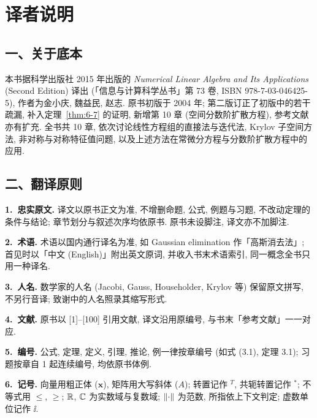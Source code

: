 \cleardoublepage
{}
\chapter*{译者说明}

\section*{一、关于底本}

本书据科学出版社 2015 年出版的 \textit{Numerical Linear Algebra and Its Applications} (Second Edition) 译出 (「信息与计算科学丛书」第 73 卷, ISBN 978-7-03-046425-5), 作者为金小庆, 魏益民, 赵志. 原书初版于 2004 年; 第二版订正了初版中的若干疏漏, 补入定理~\ref{thm:6-7} 的证明, 新增第 10 章 (空间分数阶扩散方程), 参考文献亦有扩充. 全书共 10 章, 依次讨论线性方程组的直接法与迭代法, Krylov 子空间方法, 非对称与对称特征值问题, 以及上述方法在常微分方程与分数阶扩散方程中的应用.

\section*{二、翻译原则}

\noindent\textbf{1.~忠实原文.} 译文以原书正文为准, 不增删命题, 公式, 例题与习题, 不改动定理的条件与结论; 章节划分与叙述次序均依原书. 原书未设脚注, 译文亦不加脚注.

\smallskip
\noindent\textbf{2.~术语.} 术语以国内通行译名为准, 如 Gaussian elimination 作「高斯消去法」; 首见时以「中文 (English)」附出英文原词, 并收入书末术语索引, 同一概念全书只用一种译名.

\smallskip
\noindent\textbf{3.~人名.} 数学家的人名 (Jacobi, Gauss, Householder, Krylov 等) 保留原文拼写, 不另行音译; 致谢中的人名照录其缩写形式.

\smallskip
\noindent\textbf{4.~文献.} 原书以 [1]--[100] 引用文献, 译文沿用原编号, 与书末「参考文献」一一对应.

\smallskip
\noindent\textbf{5.~编号.} 公式, 定理, 定义, 引理, 推论, 例一律按章编号 (如式 (3.1), 定理 3.1); 习题按章自 1 起连续编号, 均依原书体例.

\smallskip
\noindent\textbf{6.~记号.} 向量用粗正体 ($\mathbf{x}$), 矩阵用大写斜体 ($A$); 转置记作 $^{T}$, 共轭转置记作 $^{*}$; 不等式用 $\leqslant$, $\geqslant$; $\mathbb{R}$, $\mathbb{C}$ 为实数域与复数域; $\left\|\cdot\right\|$ 为范数, 所指依上下文判定; 虚数单位记作 $\ii$.

